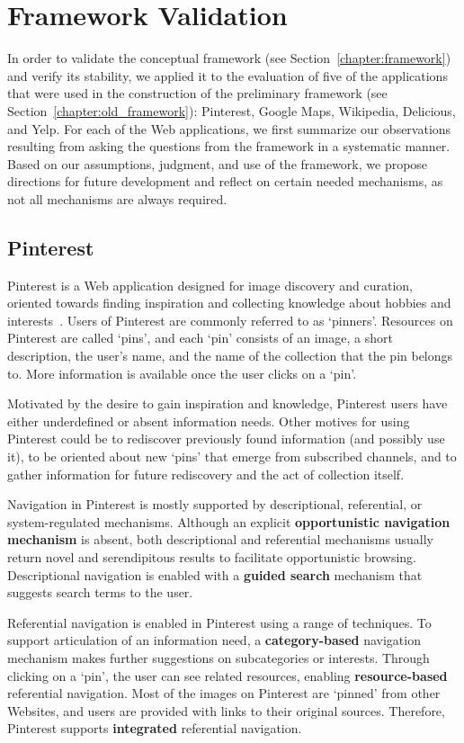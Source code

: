 \documentclass{sigchi}
\begin{document}
{\section{Framework Validation}
In order to validate the conceptual framework (see Section~\ref{chapter:framework}) and verify its stability, we applied it to the evaluation of five of the applications that were used in the construction of the preliminary framework (see Section~\ref{chapter:old_framework}): Pinterest, Google Maps, Wikipedia, Delicious, and Yelp. For each of the Web applications, we first summarize our observations resulting from asking the questions from the framework in a systematic manner. Based on our assumptions, judgment, and use of the framework, we propose directions for future development and reflect on certain needed mechanisms, as not all mechanisms are always required.  

{\subsection{Pinterest}
Pinterest is a Web application designed for image discovery and curation, oriented towards finding inspiration and collecting knowledge about hobbies and interests~\cite{gilbert2013need,zarro2012pinterest,ottoni2013ladies}.  Users of Pinterest are commonly referred to as `pinners'. Resources on Pinterest are called `pins', and each `pin' consists of an image, a short description, the user's name, and the name of the collection that the pin belongs to. More information is available once the user clicks on a `pin'.

Motivated by the desire to gain inspiration and knowledge, Pinterest users have either underdefined or absent information needs. Other motives for using Pinterest could be to rediscover previously found information (and possibly use it), to be oriented about new `pins' that emerge from subscribed channels, and to gather information for future rediscovery and the act of collection itself.


Navigation in Pinterest is mostly supported by descriptional, referential, or system-regulated mechanisms. Although an explicit \textbf{opportunistic navigation mechanism} is absent, both descriptional and referential mechanisms usually return novel and serendipitous results to facilitate opportunistic browsing. Descriptional navigation is enabled with a \textbf{guided search} mechanism that suggests search terms to the user. 

Referential navigation is enabled in Pinterest using a range of techniques. To support articulation of an information need, a \textbf{category-based} navigation mechanism makes further suggestions on subcategories or interests. Through clicking on a `pin', the user can see related resources, enabling \textbf{resource-based} referential navigation. Most of the images on Pinterest are `pinned' from other Websites, and users are provided with links to their original sources. Therefore, Pinterest supports \textbf{integrated} referential navigation.

}}
\end{document}
